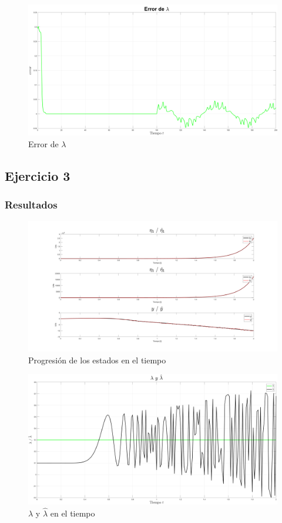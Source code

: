 \begin{figure}[H]
	\centering
	\includegraphics[width=150mm]{img/E2_ErrorLambda.png}
	\caption{Error de $\lambda$}
	\label{img:rossler4}
\end{figure}

\subsection*{Ejercicio 3}


\subsubsection*{Resultados}
\begin{figure}[H]
	\centering
	\includegraphics[width=150mm]{img/E3_Estados.png}
	\caption{Progresión de los estados en el tiempo}
	\label{img:rossler5}
\end{figure}

\begin{figure}[H]
	\centering
	\includegraphics[width=150mm]{img/E3_Lambda.png}
	\caption{$\lambda$ y $\hat{\lambda}$ en el tiempo}
	\label{img:rossler6}
\end{figure}

